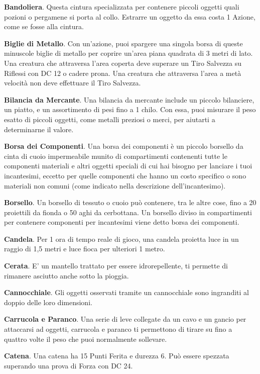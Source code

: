\documentclass[12pt,a4paper,twoside,openany]{book}
\begin{document}
\begin{multicols}{2}
\textbf{Bandoliera}. Questa cintura specializzata per contenere piccoli oggetti quali pozioni o pergamene si porta al collo. Estrarre un oggetto da essa costa 1 Azione, come se fosse alla cintura.

\textbf{Biglie di Metallo}. Con un’azione, puoi spargere una singola borsa di queste minuscole biglie di metallo per coprire un’area piana quadrata di 3 metri di lato. Una creatura che attraversa l’area coperta deve superare un Tiro Salvezza su Riflessi con DC 12 o cadere prona. Una creatura che attraversa l’area a metà velocità non deve effettuare il Tiro Salvezza.

\textbf{Bilancia da Mercante}. Una bilancia da mercante include un piccolo bilanciere, un piatto, e un assortimento di pesi fino a 1 chilo. Con essa, puoi misurare il peso esatto di piccoli oggetti, come metalli preziosi o merci, per aiutarti a determinarne il valore.

\textbf{Borsa dei Componenti}. Una borsa dei componenti è un piccolo borsello da cinta di cuoio impermeabile munito di compartimenti contenenti tutte le componenti materiali e altri oggetti speciali di cui hai bisogno per lanciare i tuoi incantesimi, eccetto per quelle componenti che hanno un costo specifico o sono materiali non comuni (come indicato nella descrizione dell’incantesimo).

\textbf{Borsello}. Un borsello di tessuto o cuoio può contenere, tra le altre cose, fino a 20 proiettili da fionda o 50 aghi da cerbottana. Un borsello diviso in compartimenti per contenere componenti per incantesimi viene detto borsa dei componenti.

\textbf{Candela}. Per 1 ora di tempo reale di gioco, una candela proietta luce in un raggio di 1,5 metri e luce fioca per ulteriori 1 metro.

\textbf{Cerata}. E' un mantello trattato per essere idrorepellente, ti permette di rimanere asciutto anche sotto la pioggia.

\textbf{Cannocchiale}. Gli oggetti osservati tramite un cannocchiale sono ingranditi al doppio delle loro dimensioni.

\textbf{Carrucola e Paranco}. Una serie di leve collegate da un cavo e un gancio per attaccarsi ad oggetti, carrucola e paranco ti permettono di tirare su fino a quattro volte il
peso che puoi normalmente sollevare.

\textbf{Catena}. Una catena ha 15 Punti Ferita e durezza 6. Può essere spezzata superando una prova di Forza con DC 24.


\end{multicols}
\end{document}
